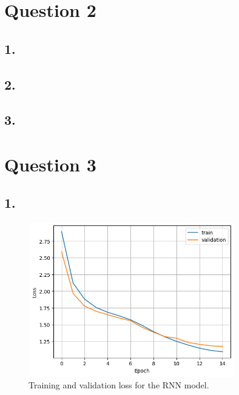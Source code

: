 \documentclass[11pt]{article}
\begin{document}
\section{Question 2}
\subsection{1.}
\subsection{2.}
\subsection{3.}
\section{Question 3}
\subsection{1.}
\begin{figure}[H]
    \centering
    \includegraphics[width=0.8\textwidth]{./plots/recurrent_loss_per_epoch}
    \caption{Training and validation loss for the RNN model.}
    \label{fig:recurrent_loss_per_epoch}
\end{figure}
\end{document}
